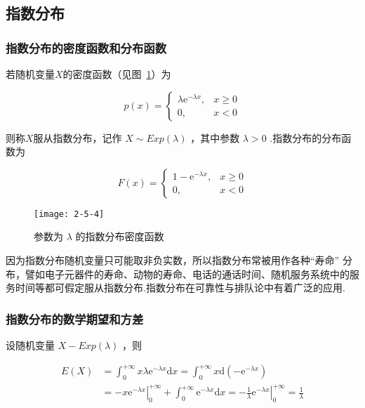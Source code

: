 \subsection{指数分布}

\subsubsection{指数分布的密度函数和分布函数}

若随机变量$ X $的密度函数（见图~\ref{fig:2-5-4}）为

\begin{equation}
p(x)=\left\{\begin{array}{cl}{\lambda \mathrm{e}^{-\lambda x},} & {x \geqslant 0} \\ {0,} & {x<0}\end{array}\right. \label{eq:2.5.8}
\end{equation}

则称$ X $服从指数分布，记作 $X \sim E x p(\lambda)$ ，其中参数 $\lambda>0$ .指数分布的分布函数为

\begin{equation}
F(x)=\left\{\begin{array}{cl}{1-\mathrm{e}^{-\lambda x},} & {x \geqslant 0} \\ {0,} & {x<0}\end{array}\right. \label{eq:2.5.9}
\end{equation}

\begin{figure}
	\centering
	\texttt{[image: 2-5-4]}
	\caption{参数为 $\lambda$ 的指数分布密度函数}
	\label{fig:2-5-4}
\end{figure}

因为指数分布随机变量只可能取非负实数，所以指数分布常被用作各种“寿命”
分布，譬如电子元器件的寿命、动物的寿命、电话的通话时间、随机服务系统中的服务时间等都可假定服从指数分布.指数分布在可靠性与排队论中有着广泛的应用.

\subsubsection{指数分布的数学期望和方差}

设随机变量 $X-E x p(\lambda)$ ，则

\[
\begin{aligned} 
E(X) &=\int_{0}^{+\infty} x \lambda \mathrm{e}^{-\lambda x} \mathrm{d} x=\int_{0}^{+\infty} x \mathrm{d}\left(-\mathrm{e}^{-\lambda x}\right) \\
&=-x\left.\mathrm{e}^{-\lambda x}\right|_{0} ^{+\infty}+\int_{0}^{+\infty} \mathrm{e}^{-\lambda x} \mathrm{d} x=-\frac{1}{\lambda}\left.\mathrm{e}^{-\lambda x}\right|_{0} ^{+\infty}=\frac{1}{\lambda} 
\end{aligned}
\]

